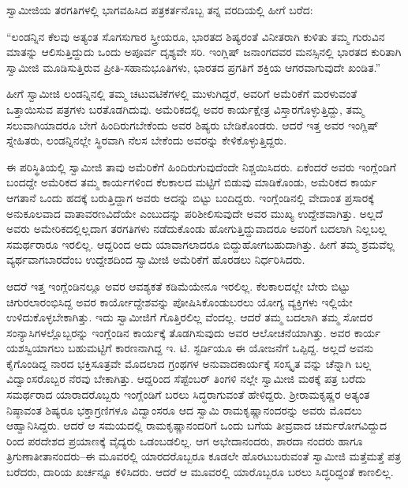 ಸ್ವಾಮೀಜಿಯ ತರಗತಿಗಳಲ್ಲಿ ಭಾಗವಹಿಸಿದ ಪತ್ರಕರ್ತನೊಬ್ಬ ತನ್ನ ವರದಿಯಲ್ಲಿ ಹೀಗೆ ಬರೆದ:

“ಲಂಡನ್ನಿನ ಕೆಲವು ಅತ್ಯಂತ ಸೊಗಸುಗಾರ ಸ್ತ್ರೀಯರೂ, ಭಾರತದ ಶಿಷ್ಯರಂತೆ ವಿನೀತರಾಗಿ ಕುಳಿತು ತಮ್ಮ ಗುರುವಿನ ಮಾತನ್ನು ಆಲಿಸುತ್ತಿದ್ದುದು ಒಂದು ಅಪೂರ್ವ ದೃಶ್ಯವೇ ಸರಿ. ಇಂಗ್ಲಿಷ್ ಜನಾಂಗದವರ ಮನಸ್ಸಿನಲ್ಲಿ ಭಾರತದ ಕುರಿತಾಗಿ ಸ್ವಾಮೀಜಿ ಮೂಡಿಸುತ್ತಿರುವ ಪ್ರೀತಿ-ಸಹಾನುಭೂತಿಗಳು, ಭಾರತದ ಪ್ರಗತಿಗೆ ಶಕ್ತಿಯ ಆಗರವಾಗುವುದೇ ಖಂಡಿತ.”

ಹೀಗೆ ಸ್ವಾಮೀಜಿ ಲಂಡನ್ನಿನಲ್ಲಿ ತಮ್ಮ ಚಟುವಟಿಕೆಗಳಲ್ಲಿ ಮುಳುಗಿದ್ದರೆ, ಅವರಿಗೆ ಅಮೆರಿಕೆಗೆ ಮರಳುವಂತೆ ಒತ್ತಾಯಿಸುವ ಪತ್ರಗಳು ಬರತೊಡಗಿದುವು. ಅಮೆರಿಕದಲ್ಲಿ ಅವರ ಕಾರ್ಯಕ್ಷೇತ್ರ ವಿಸ್ತಾರಗೊಳ್ಳುತ್ತಿದ್ದು, ತಮ್ಮ ಸಲುವಾಗಿಯಾದರೂ ಬೇಗೆ ಹಿಂದಿರುಗಬೇಕೆಂದು ಅವರ ಶಿಷ್ಯರು ಬೇಡಿಕೊಂಡರು. ಆದರೆ ಇತ್ತ ಅವರ ಇಂಗ್ಲಿಷ್ ಸ್ನೇಹಿತರು, ಲಂಡನ್ನಿನಲ್ಲೇ ಸ್ಥಿರವಾಗಿ ನೆಲಸ ಬೇಕೆಂದು ಅವರನ್ನು ಕೇಳಿಕೊಳ್ಳುತ್ತಿದ್ದರು.

ಈ ಪರಿಸ್ಥಿತಿಯಲ್ಲಿ ಸ್ವಾಮೀಜಿ ತಾವು ಅಮೆರಿಕೆಗೆ ಹಿಂದಿರುಗುವುದೆಂದೇ ನಿಶ್ಚಯಿಸಿದರು. ಏಕೆಂದರೆ ಅವರು ಇಂಗ್ಲೆಂಡಿಗೆ ಬಂದದ್ದೇ ಅಮೆರಿಕದ ತಮ್ಮ ಕಾರ್ಯಗಳಿಂದ ಕೆಲಕಾಲದ ಮಟ್ಟಿಗೆ ಬಿಡುವು ಮಾಡಿಕೊಂಡು, ಅಮೆರಿಕದ ಕಾರ್ಯ ಆಗತಾನೆ ಒಂದು ಹದಕ್ಕೆ ಬರುತ್ತಿದ್ದಾಗ ಅವರು ಅದನ್ನು ಬಿಟ್ಟು ಬಂದಿದ್ದರು. ಇಂಗ್ಲೆಂಡಿನಲ್ಲಿ ವೇದಾಂತ ಪ್ರಸಾರಕ್ಕೆ ಅನುಕೂಲವಾದ ವಾತಾವರಣವಿದೆಯೇ ಎಂಬುದನ್ನು ಪರಿಶೀಲಿಸುವುದೇ ಅವರ ಮುಖ್ಯ ಉದ್ದೇಶವಾಗಿತ್ತು. ಅಲ್ಲದೆ ಅವರು ಅಮೇರಿಕದಲ್ಲಿಲ್ಲದಾಗ ತರಗತಿಗಳು ನಡೆದುಕೊಂಡು ಹೋಗುತ್ತಿದ್ದುವಾದರೂ ಅವರಿಗೆ ಬದಲಾಗಿ ನಿಲ್ಲಬಲ್ಲ ಸಮರ್ಥರಾರೂ ಇರಲಿಲ್ಲ. ಆದ್ದರಿಂದ ಅದು ಯಾವಾಗಲಾದರೂ ಬಿದ್ದುಹೋಗಬಹುದಾಗಿತ್ತು. ಹೀಗೆ ತಮ್ಮ ಶ್ರಮವೆಲ್ಲ ವ್ಯರ್ಥವಾಗಬಾರದೆಂಬ ಉದ್ದೇಶದಿಂದ ಸ್ವಾಮೀಜಿ ಅಮೆರಿಕೆಗೆ ಹೊರಡಲು ನಿರ್ಧರಿಸಿದರು.

ಆದರೆ ಇತ್ತ ಇಂಗ್ಲೆಂಡಿನಲ್ಲೂ ಅವರ ಆವಶ್ಯಕತೆ ಕಡಿಮೆಯೇನೂ ಇರಲಿಲ್ಲ. ಕೆಲಕಾಲದಲ್ಲೇ ಬೇರು ಬಿಟ್ಟು ಚಿಗುರಲಾರಂಭಿಸಿದ್ದ ಅವರ ಕಾರ್ಯೋದ್ದೇಶವನ್ನು ಪೋಷಿಸಿಕೊಂಡುಬರಲು ಯೋಗ್ಯ ವ್ಯಕ್ತಿಗಳು ಇಲ್ಲಿಯೇ ಉಳಿದುಕೊಳ್ಳಬೇಕಾಗಿತ್ತು. ಇದು ಸ್ವಾಮೀಜಿಗೆ ಗೊತ್ತಿರಲಿಲ್ಲ ವೆಂದಲ್ಲ. ಆದರೆ ತಮ್ಮ ಬದಲಾಗಿ ತಮ್ಮ ಸೋದರ ಸಂನ್ಯಾಸಿಗಳಲ್ಲೊಬ್ಬರನ್ನು ಇಂಗ್ಲೆಂಡಿನ ಕಾರ್ಯಕ್ಕೆ ತೊಡಗಿಸುವುದು ಅವರ ಆಲೋಚನೆಯಾಗಿತ್ತು. ಅವರ ಕಾರ್ಯ ಯಶಸ್ವಿಯಾಗಲು ಬಹುಮಟ್ಟಿಗೆ ಕಾರಣನಾಗಿದ್ದ ಇ. ಟಿ. ಸ್ಟರ್ಡಿಯೂ ಈ ಯೋಜನೆಗೆ ಒಪ್ಪಿದ್ದ. ಅಲ್ಲದೆ ಅವನು ಕೈಗೊಂಡಿದ್ದ ನಾರದ ಭಕ್ತಿಸೂತ್ರವೇ ಮೊದಲಾದ ಗ್ರಂಥಗಳ ಅನುವಾದಕಾರ್ಯಕ್ಕೆ ಸಂಸ್ಕೃತ ವನ್ನು ಚೆನ್ನಾಗಿ ಬಲ್ಲ ವಿದ್ವಾಂಸರೊಬ್ಬರ ನೆರವು ಬೇಕಾಗಿತ್ತು. ಆದ್ದರಿಂದ ಸೆಪ್ಟೆಂಬರ್ ತಿಂಗಳಿ ನಲ್ಲೇ ಸ್ವಾಮೀಜಿ ಮಠಕ್ಕೆ ಪತ್ರ ಬರೆದು ಸಮರ್ಥರಾದ ಯಾರಾದರೊಬ್ಬರು ಇಂಗ್ಲೆಂಡಿಗೆ ಬರಲು ಸಿದ್ಧರಾಗುವಂತೆ ಹೇಳಿದ್ದರು. ಶ್ರೀರಾಮಕೃಷ್ಣರ ಅತ್ಯಂತ ನಿಷ್ಠಾವಂತ ಶಿಷ್ಯರೂ ಭಕ್ತಾಗ್ರಣಿಗಳೂ ವಿದ್ವಾಂಸರೂ ಆದ ಸ್ವಾಮಿ ರಾಮಕೃಷ್ಣಾನಂದರನ್ನು ಅವರು ಮೊದಲು ಆಹ್ವಾನಿಸಿದ್ದರು. ಆದರೆ ಆ ಸಮಯದಲ್ಲಿ ರಾಮಕೃಷ್ಣಾನಂದರಿಗೆ ಒಂದು ಬಗೆಯ ತೀವ್ರವಾದ ಚರ್ಮರೋಗವಿದ್ದುದ ರಿಂದ ಪರದೇಶದ ಪ್ರಯಾಣಕ್ಕೆ ವೈದ್ಯರು ಒಡಂಬಡಲಿಲ್ಲ. ಆಗ ಅಭೇದಾನಂದರು, ಶಾರದಾ ನಂದರು ಹಾಗೂ ತ್ರಿಗುಣಾತೀತಾನಂದರು–ಈ ಮೂವರಲ್ಲಿ ಯಾರದರೊಬ್ಬರೂ ಕೂಡಲೇ ಹೊರಟುಬರುವಂತೆ ಸ್ವಾಮೀಜಿ ಮತ್ತೆಮತ್ತೆ ಪತ್ರ ಬರೆದರು, ದಾರಿಯ ಖರ್ಚನ್ನೂ ಕಳಿಸಿದರು. ಆದರೆ ಆ ಮೂವರಲ್ಲಿ ಯಾರೊಬ್ಬರೂ ಬರಲು ಸಿದ್ಧರಿದ್ದಂತೆ ಕಾಣಲಿಲ್ಲ.

